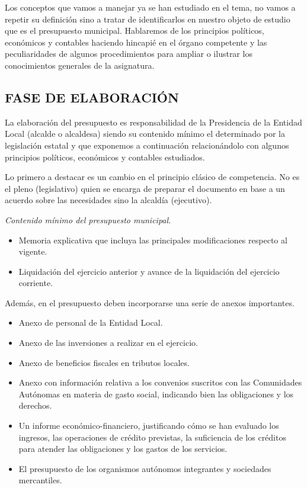\documentclass[
]{article}
\begin{document}
Los conceptos que vamos a manejar ya se han estudiado en el tema, no
vamos a repetir su definición sino a tratar de identificarlos en nuestro
objeto de estudio que es el presupuesto municipal. Hablaremos de los
principios políticos, económicos y contables haciendo hincapié en el
órgano competente y las peculiaridades de algunos procedimientos para
ampliar o ilustrar los conocimientos generales de la asignatura.

\hypertarget{fase-de-elaboraciuxf3n}{%
\subsection{FASE DE ELABORACIÓN}\label{fase-de-elaboraciuxf3n}}

La elaboración del presupuesto es responsabilidad de la Presidencia de
la Entidad Local (alcalde o alcaldesa) siendo su contenido mínimo el
determinado por la legislación estatal y que exponemos a continuación
relacionándolo con algunos principios políticos, económicos y contables
estudiados.

Lo primero a destacar es un cambio en el principio clásico de
competencia. No es el pleno (legislativo) quien se encarga de preparar
el documento en base a un acuerdo sobre las necesidades sino la alcaldía
(ejecutivo).

\emph{Contenido mínimo del presupuesto municipal.}

\begin{itemize}
\item
  Memoria explicativa que incluya las principales modificaciones
  respecto al vigente.
\item
  Liquidación del ejercicio anterior y avance de la liquidación del
  ejercicio corriente.
\end{itemize}

Además, en el presupuesto deben incorporarse una serie de anexos
importantes.

\begin{itemize}
\item
  Anexo de personal de la Entidad Local.
\item
  Anexo de las inversiones a realizar en el ejercicio.
\item
  Anexo de beneficios fiscales en tributos locales.
\item
  Anexo con información relativa a los convenios suscritos con las
  Comunidades Autónomas en materia de gasto social, indicando bien las
  obligaciones y los derechos.
\item
  Un informe económico-financiero, justificando cómo se han evaluado los
  ingresos, las operaciones de crédito previstas, la suficiencia de los
  créditos para atender las obligaciones y los gastos de los servicios.
\item
  El presupuesto de los organismos autónomos integrantes y sociedades
  mercantiles.
\end{itemize}
\end{document}
